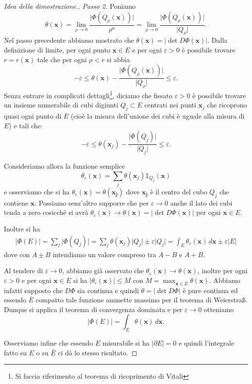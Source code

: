 \documentclass[italian,a4paper]{scrartcl}
\newcommand{\eps}{\varepsilon}
\newcommand{\defeq}{=}
\renewcommand{\vec}{\mathbf}
\begin{document}
\begin{proof}[Idea della dimostrazione.]
\emph{Passo 2.}
Poniamo
\[
 \theta(\vec x) \defeq 
\lim_{\rho \to 0} \frac{\lvert
   \Phi(Q_\rho(\vec x)) \rvert}{\rho^n}
=
\lim_{\rho \to 0} \frac{\lvert
   \Phi(Q_\rho(\vec x)) \rvert}{\lvert Q_\rho\rvert}.
\]
Nel passo precedente abbiamo mostrato che $\theta(\vec x)=\lvert
\det D\Phi(\vec x)\rvert$.
Dalla definizione di limite, 
per ogni punto $\vec x\in E$ e per ogni $\eps>0$ è possibile trovare $r=r(\vec x)$ tale
che per ogni $\rho<r$ si abbia
\[
-\eps \le \theta(\vec x) - \frac{\lvert \Phi(Q_\rho(\vec x))\rvert}{\lvert Q_\rho\rvert}\le \eps.
\]
Senza entrare in complicati dettagli\footnote{Si faccia riferimento al
teorema di ricoprimento di Vitali}, diciamo che fissato $\eps>0$ è possibile trovare
un insieme numerabile di cubi digiunti $Q_j\subset E$ centrati nei punti
$\vec x_j$ che ricoprono quasi ogni punto di $E$ (cioè la misura
dell'unione dei cubi è uguale alla misura di $E$) e tali che:
\[
-\eps \le \theta(\vec x_j) - \frac{\lvert \Phi(Q_j)\rvert}{\lvert Q_j\rvert}\le\eps.
\]

Consideriamo allora la funzione semplice
$$
\theta_\eps(\vec x) = \sum_j \theta(\vec x_j) \mathbb 1_{Q_j}(\vec x)
$$
e osserviamo che si ha $\theta_\eps(\vec x) = \theta(\vec {x_j})$ dove
$\vec {x_j}$ 
è il centro del cubo $Q_j$ che contiene $\vec x$. Possiamo senz'altro supporre
che per $\eps \to 0$ anche il lato dei cubi tenda a zero cosicché si
avrà $\theta_\eps(\vec x)\to \theta(\vec x) = \lvert \det D\Phi(\vec
x)\rvert$ per ogni $\vec x \in E$.

Inoltre si ha
\begin{align*}
\lvert \Phi(E) \rvert
= \sum_j \lvert \Phi(Q_j)\rvert
= \sum_j \theta(\vec x_j)\lvert Q_j \rvert  \pm \eps \lvert Q_j \rvert
= \int_E \theta_\eps(\vec x)\, d\vec x \pm \eps \lvert E\rvert
\end{align*}
dove con $A\pm B$ intendiamo un valore compreso tra $A-B$ e $A+B$. 

Al tendere di $\eps \to 0$, abbiamo già osservato che
$\theta_\eps(\vec x) \to \theta(\vec x)$, inoltre per ogni
$\eps>0$ e per ogni $\vec x\in E$ si ha $\lvert \theta_\eps(\vec
x)\rvert \le M$ con $M=\max_{\vec x \in \bar E} \theta(\vec
x)$. Abbiamo infatti supposto che $D\Phi$ sia continua e quindi
$\theta = \lvert \det D\Phi\rvert$ è pure continua ed essendo $\bar E$ 
compatto tale funzione ammette massimo per il teorema di Weierstra\ss.
Dunque si applica il teorema di convergenza dominata e per $\eps\to 0$
otteniamo 
\[
\lvert \Phi(E) \rvert = \int_E \theta(\vec x)\, d\vec x.
\]

Osserviamo infine che essendo $E$ misurabile si ha $\lvert \partial
E\rvert = 0$ e quindi l'integrale fatto su $E$ 
o su $\bar E$ ci dà lo stesso risultato.
\end{proof}
\end{document}
